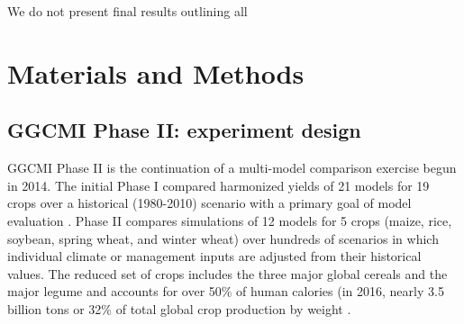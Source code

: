 \documentclass[preprint, 5p, times, twocolumn]{elsarticle}
\begin{document}
We do not present final results outlining all 

\section{Materials and Methods}
\label{S:2}
\subsection{GGCMI Phase II: experiment design}
GGCMI Phase II is the continuation of a multi-model comparison exercise begun in 2014. The initial Phase I compared harmonized yields of 21 models for 19 crops over a historical (1980-2010) scenario with a primary goal of model evaluation \citep{Elliott2015, muller_global_2017}. Phase II compares simulations of 12 models for 5 crops (maize, rice, soybean, spring wheat, and winter wheat) over hundreds of scenarios in which individual climate or management inputs are adjusted from their historical values. The reduced set of crops includes the three major global cereals and the major legume and accounts for over 50\% of human calories (in 2016, nearly 3.5 billion tons or 32\% of total global crop production by weight \citep{FAOSTAT}. 
\end{document}
